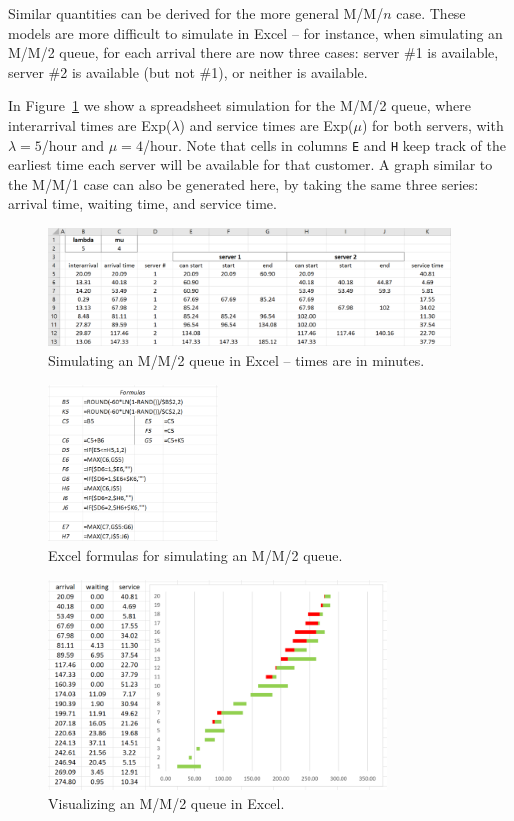 Similar quantities can be derived for the more general M/M/$n$ case.
These models are more difficult to simulate in Excel -- for instance, when simulating an M/M/2 queue, for each arrival there are now three cases: server \#1 is available, server \#2 is available (but not \#1), or neither is available.

In Figure~\ref{fig:4_queue2} we show a spreadsheet simulation for the M/M/2 queue, where interarrival times are Exp($\lambda$) and service times are Exp($\mu$) for both servers, with $\lambda = 5$/hour and $\mu = 4$/hour.
Note that cells in columns \texttt{E} and \texttt{H} keep track of the earliest time each server will be available for that customer.
A graph similar to the M/M/1 case can also be generated here, by taking the same three series: arrival time, waiting time, and service time.

\begin{figure}[htbp]
	\centering
	\includegraphics[width=0.95\textwidth]{fig/4_queue2.png}
	\caption{Simulating an M/M/2 queue in Excel -- times are in minutes. \label{fig:4_queue2}}
\end{figure}

\begin{figure}[htbp]
	\centering
	\includegraphics[width=0.4\textwidth]{fig/4_queue2formulas.png}
	\caption{Excel formulas for simulating an M/M/2 queue. \label{fig:4_queue2formulas}}
\end{figure}

\begin{figure}[htbp]
	\centering
	\includegraphics[width=0.8\textwidth]{fig/4_queue2chart.png}
	\caption{Visualizing an M/M/2 queue in Excel. \label{fig:4_queue2chart}}
\end{figure}

